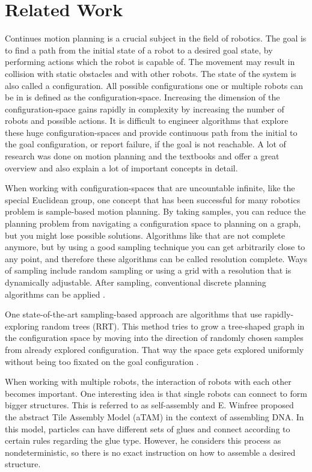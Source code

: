\section{Related Work}

Continues motion planning is a crucial subject in the field of robotics.
The goal is to find a path from the initial state of a robot to a desired goal state, by performing actions which the robot is capable of.
The movement may result in collision with static obstacles and with other robots.
The state of the system is also called a configuration.
All possible configurations one or multiple robots can be in is defined as the configuration-space.
Increasing the dimension of the configuration-space gains rapidly in complexity by increasing the number of robots and possible actions.
It is difficult to engineer algorithms that explore these huge configuration-spaces and provide continuous path from the initial to the goal configuration, or report failure, if the goal is not reachable.
A lot of research was done on motion planning and the textbooks \cite{LaValle2006} and \cite{Mueller2019} offer a great overview and also explain a lot of important concepts in detail.

When working with configuration-spaces that are uncountable infinite, like the special Euclidean group, one concept that has been successful for many robotics problem is sample-based motion planning.
By taking samples, you can reduce the planning problem from navigating a configuration space to planning on a graph, but you might lose possible solutions.
Algorithms like that are not complete anymore, but by using a good sampling technique you can get arbitrarily close to any point, and therefore these algorithms can be called resolution complete.
Ways of sampling include random sampling or using a grid with a resolution that is dynamically adjustable.
After sampling, conventional discrete planning algorithms can be applied \cite{LaValle2006}.

One state-of-the-art sampling-based approach are algorithms that use rapidly-exploring random trees (RRT).
This method tries to grow a tree-shaped graph in the configuration space by moving into the direction of randomly chosen samples from already explored configuration. That way the space gets explored uniformly without being too fixated on the goal configuration \cite{lavalle1998,lavalle2001}.

When working with multiple robots, the interaction of robots with each other becomes important.
One interesting idea is that single robots can connect to form bigger structures.
This is referred to as self-assembly and E. Winfree \cite{winfree1998} proposed the abstract Tile Assembly Model (aTAM) in the context of assembling DNA.
In this model, particles can have different sets of glues and connect according to certain rules regarding the glue type.
However, he considers this process as nondeterministic, so there is no exact instruction on how to assemble a desired structure.

